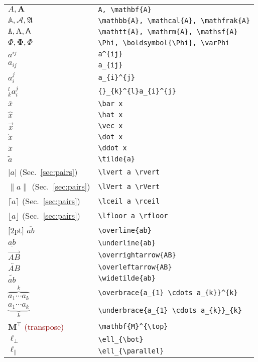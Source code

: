 \documentclass[a4paper,10pt,landscape]{article}
\theoremstyle{definition}
\theoremstyle{remark}
\newcommand{\refsec}[1]{Sec.~\ref{#1}}
\newcommand{\hDesc}[1]{\textcolor{darkred}{(#1)}} %
\begin{document}
\begin{multicols}{3}
\begin{tabular}{@{}ll@{}}
	$A, \mathbf{A}$	&\verb!A, \mathbf{A}!\\
	$\mathbb{A}, \mathcal{A}, \mathfrak{A}$	&\verb!\mathbb{A}, \mathcal{A}, \mathfrak{A}!\\
	$\mathtt{A}, \mathrm{A}, \mathsf{A}$	&\verb!\mathtt{A}, \mathrm{A}, \mathsf{A}!\\
	$\Phi, \boldsymbol{\Phi}, \varPhi$	&\verb!\Phi, \boldsymbol{\Phi}, \varPhi!\\
	$a^{ij}$	&\verb!a^{ij}!\\
	$a_{ij}$	&\verb!a_{ij}!\\
	$a_{i}^{j}$	&\verb!a_{i}^{j}!\\
	${}_{k}^{l}a_{i}^{j}$	&\verb!{}_{k}^{l}a_{i}^{j}!\\
	$\bar x$	&\verb!\bar x!\\
	$\hat x$	&\verb!\hat x!\\
	$\vec x$	&\verb!\vec x!\\
	$\dot x$	&\verb!\dot x!\\
	$\ddot x$	&\verb!\ddot x!\\
	$\tilde{a}$	&\verb!\tilde{a}!\\
	$\lvert a \rvert$ (\refsec{sec:pairs})	&\verb!\lvert a \rvert!\\
	$\lVert a \rVert$ (\refsec{sec:pairs})	&\verb!\lVert a \rVert!\\
	$\lceil a \rceil$ (\refsec{sec:pairs})	&\verb!\lceil a \rceil!\\
	$\lfloor a \rfloor$ (\refsec{sec:pairs})	&\verb!\lfloor a \rfloor!\\
	[2pt]
	$\overline{ab}$	&\verb!\overline{ab}!\\
	$\underline{ab}$	&\verb!\underline{ab}!\\
	[2pt]
	$\overrightarrow{AB}$	&\verb!\overrightarrow{AB}!\\
	[2pt]
	$\overleftarrow{AB}$	&\verb!\overleftarrow{AB}!\\
	[2pt]
	$\widetilde{ab}$	&\verb!\widetilde{ab}!\\
	[2pt]
	$\overbrace{a_{1} \cdots a_{k}}^{k}$	&\verb!\overbrace{a_{1} \cdots a_{k}}^{k}!\\
	[2pt]
	$\underbrace{a_{1} \cdots a_{k}}_{k}$	&\verb!\underbrace{a_{1} \cdots a_{k}}_{k}!\\
	[2pt]
	$\mathbf{M}^{\top}$	\hDesc{transpose}	&\verb!\mathbf{M}^{\top}!\\
	$\ell_{\bot}$	&\verb!\ell_{\bot}!\\
	$\ell_{\parallel}$	&\verb!\ell_{\parallel}!\\
\end{tabular}





\end{multicols}
\end{document}
